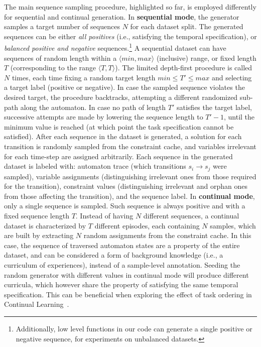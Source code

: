 The main sequence sampling procedure, highlighted so far, is employed differently for sequential and continual generation.
In \textbf{sequential mode}, the generator samples a target number of sequences $N$ for each dataset split. The generated sequences can be either \textit{all positives} (i.e., satisfying the temporal specification), or \textit{balanced positive and negative} sequences.\footnote{Additionally, low level functions in our code can generate a single positive or negative sequence, for experiments on unbalanced datasets.}
A sequential dataset can have sequences of random length within a $\langle min, max\rangle$ (inclusive) range, or fixed length $T$ (corresponding to the range $\langle T, T\rangle$).
The limited depth-first procedure is called $N$ times, each time fixing a random target length $min \leq T' \leq max$ and selecting a target label (positive or negative).
In case the sampled sequence violates the desired target, the procedure backtracks, attempting a different randomized sub-path along the automaton. In case no path of length $T'$ satisfies the target label, successive attempts are made by lowering the sequence length to $T' - 1$, until the minimum value is reached (at which point the task specification cannot be satisfied).
After each sequence in the dataset is generated, a solution for each transition is randomly sampled from the constraint cache, and variables irrelevant for each time-step are assigned arbitrarily. Each sequence in the generated dataset is labeled with: automaton trace (which transitions $s_i\rightarrow s_j$ were sampled), variable assignments (distinguishing irrelevant ones from those required for the transition), constraint values (distinguishing irrelevant and orphan ones from those affecting the transition), and the sequence label.
In \textbf{continual mode}, only a single sequence is sampled. Such sequence is always positive and with a fixed sequence length $T$. Instead of having $N$ different sequences, a continual dataset is characterized by $T$ different episodes, each containing $N$ samples, which are built by extracting $N$ random assignments from the constraint cache. In this case, the sequence of traversed automaton states are a property of the entire dataset, and can be considered a form of background knowledge (i.e., a curriculum of experiences), instead of a sample-level annotation. Seeding the random generator with different values in continual mode will produce different curricula, which however share the property of satisfying the same temporal specification. This can be beneficial when exploring the effect of task ordering in Continual Learning~\cite{mannelli2024tilting}.

